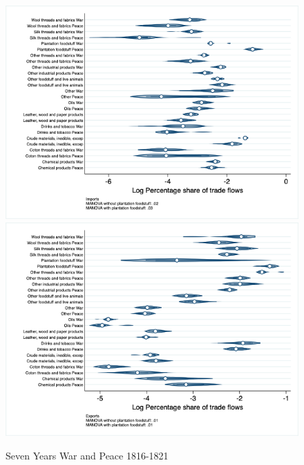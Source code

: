 \documentclass[12pt,a4paper,notitlepage,english]{article}
\begin{document}
\begin{appendix}
\begin{figure}[h!]
\centering
\caption{Seven Years War and Peace 1816-1821}
\label{seven_peace1764_1777_nat_distr_sitc}
\includegraphics[scale=.4]{seven_peace1764_1777_nat_distr_Isitc}
\includegraphics[scale=.4]{seven_peace1764_1777_nat_distr_Xsitc}
\end{figure}


\end{appendix}
\end{document}
